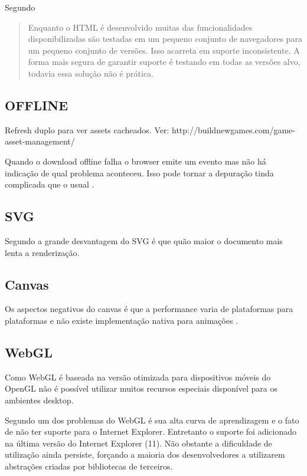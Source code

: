\begin{draft}
Segundo \cite{crossPlatformMobileGame}
\begin{quote}
Enquanto o HTML é desenvolvido muitas das funcionalidades
disponibilizadas são testadas em um pequeno conjunto de
navegadores para um pequeno conjunto de versões. Isso
acarreta em suporte inconsistente. A forma mais segura de garantir
suporte é testando em todas as versões alvo, todavia essa solução
não é prática.
\end{quote}


\subsection{OFFLINE}

Refresh duplo para ver assets cacheados. Ver:
http://buildnewgames.com/game-asset-management/

Quando o download offline falha o browser emite um evento mas não há
indicação de qual problema aconteceu. Isso pode tornar a depuração
tinda complicada que o usual \autocite{diveIntohtml}.

\subsection{SVG}

Segundo \cite{html5mostwanted} a grande desvantagem do SVG é que quão
maior o documento mais lenta a renderização.

\subsection{Canvas}

Os aspectos negativos do canvas é que a performance varia de plataformas para plataformas e não existe implementação nativa para animações \autocite{html5mostwanted}.

\subsection{WebGL}

Como WebGL é baseada na versão otimizada para dispositivos móveis do OpenGL não é possível utilizar muitos recursos especiais disponível para os ambientes desktop.

Segundo \cite{html5mostwanted} um dos problemas do WebGL é sua alta
curva de aprendizagem e o fato de não ter suporte para o Internet
Explorer. Entretanto o suporte foi adicionado na última versão do
Internet Explorer (11). Não obstante a dificuldade de utilização
ainda persiste, forçando a maioria dos desenvolvedores a utilizarem
abstrações criadas por bibliotecas de terceiros.


\end{draft}
